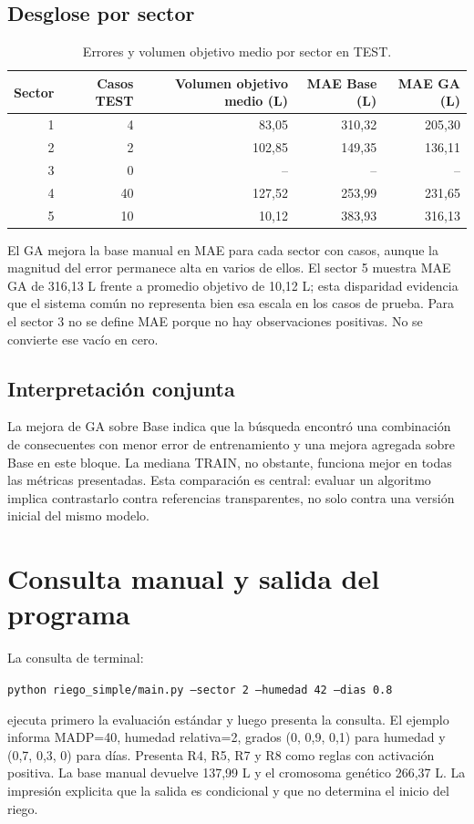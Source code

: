 \documentclass[11pt,letterpaper]{article}
\newcommand{\codigo}[1]{\texttt{\small #1}}
\begin{document}
\subsection{Desglose por sector}
\begin{table}[H]
\centering
\caption{Errores y volumen objetivo medio por sector en TEST.}\label{tab:mae-sector}
\begin{tabular}{rrrrr}
\toprule
Sector & Casos TEST & Volumen objetivo medio (L) & MAE Base (L) & MAE GA (L)\\
\midrule
1 & 4 & 83,05 & 310,32 & 205,30\\
2 & 2 & 102,85 & 149,35 & 136,11\\
3 & 0 & -- & -- & --\\
4 & 40 & 127,52 & 253,99 & 231,65\\
5 & 10 & 10,12 & 383,93 & 316,13\\
\bottomrule
\end{tabular}
\end{table}

El GA mejora la base manual en MAE para cada sector con casos, aunque la magnitud del error permanece alta en varios de ellos. El sector 5 muestra MAE GA de 316,13 L frente a promedio objetivo de 10,12 L; esta disparidad evidencia que el sistema común no representa bien esa escala en los casos de prueba. Para el sector 3 no se define MAE porque no hay observaciones positivas. No se convierte ese vacío en cero.

\subsection{Interpretación conjunta}
La mejora de GA sobre Base indica que la búsqueda encontró una combinación de consecuentes con menor error de entrenamiento y una mejora agregada sobre Base en este bloque. La mediana TRAIN, no obstante, funciona mejor en todas las métricas presentadas. Esta comparación es central: evaluar un algoritmo implica contrastarlo contra referencias transparentes, no solo contra una versión inicial del mismo modelo.

\section{Consulta manual y salida del programa}
La consulta de terminal:
\begin{center}
\codigo{python riego\_simple/main.py --sector 2 --humedad 42 --dias 0.8}
\end{center}
ejecuta primero la evaluación estándar y luego presenta la consulta. El ejemplo informa MADP=40, humedad relativa=2, grados (0, 0,9, 0,1) para humedad y (0,7, 0,3, 0) para días. Presenta R4, R5, R7 y R8 como reglas con activación positiva. La base manual devuelve 137,99 L y el cromosoma genético 266,37 L. La impresión explicita que la salida es condicional y que no determina el inicio del riego.
\end{document}
